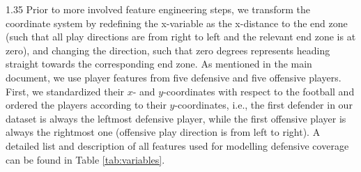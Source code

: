 \documentclass[12pt,a4paper]{article}
\begin{document}
\begin{spacing}{1.35}
Prior to more involved feature engineering steps, we transform the coordinate system by redefining the x-variable as the x-distance to the end zone (such that all play directions are from right to left and the relevant end zone is at zero), and changing the direction, such that zero degrees represents heading straight towards the corresponding end zone. As mentioned in the main document, we use player features from five defensive and five offensive players. First, we standardized their $x$- and $y$-coordinates with respect to the football and ordered the players according to their $y$-coordinates, i.e., the first defender in our dataset is always the leftmost defensive player, while the first offensive player is always the rightmost one (offensive play direction is from left to right). A detailed list and description of all features used for modelling defensive coverage can be found in Table \ref{tab:variables}. %


\begin{table}[ht]
\centering
\tiny
\caption{Model features and descriptions.}
\label{tab:variables}
\end{table}
\end{spacing}
\end{document}
